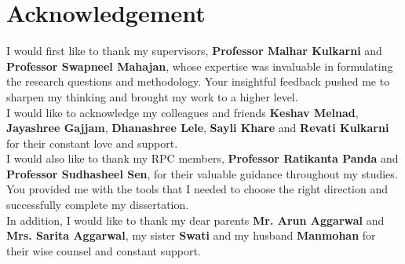 \chapter*{Acknowledgement}
\label{ch:Acknowledgements}

\vspace{10mm}
I would first like to thank my supervisors, \textbf{Professor Malhar Kulkarni} and \textbf{Professor Swapneel Mahajan}, whose expertise was invaluable in formulating the research questions and methodology. Your insightful feedback pushed me to sharpen my thinking and brought my work to a higher level.\\
I would like to acknowledge my colleagues and friends \textbf{Keshav Melnad}, \textbf{Jayashree Gajjam}, \textbf{Dhanashree Lele},  \textbf{Sayli Khare} and  \textbf{Revati Kulkarni} for their constant love and support. \\
I would also like to thank my RPC members,  \textbf{Professor Ratikanta Panda} and  \textbf{Professor Sudhasheel Sen}, for their valuable guidance throughout my studies. You provided me with the tools that I needed to choose the right direction and successfully complete my dissertation.\\
In addition, I would like to thank my dear parents  \textbf{Mr. Arun Aggarwal} and  \textbf{Mrs. Sarita Aggarwal}, my sister  \textbf{Swati} and my husband  \textbf{Manmohan} for their wise counsel and constant support. 